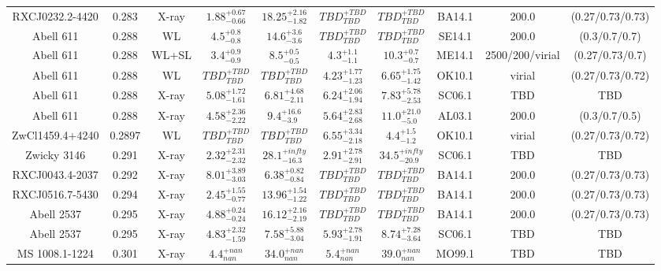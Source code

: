 \begin{table}
\begin{tabular}{cccccccccc}
RXCJ0232.2-4420 & 0.283 & X-ray & ${1.88}^{+0.67}_{-0.66}$ & ${18.25}^{+2.16}_{-1.82}$ & ${TBD}^{+TBD}_{TBD}$ & ${TBD}^{+TBD}_{TBD}$ & BA14.1 & 200.0 & (0.27/0.73/0.73) \\
Abell 611 & 0.288 & WL & ${4.5}^{+0.8}_{-0.8}$ & ${14.6}^{+3.6}_{-3.6}$ & ${TBD}^{+TBD}_{TBD}$ & ${TBD}^{+TBD}_{TBD}$ & SE14.1 & 200.0 & (0.3/0.7/0.7) \\
Abell 611 & 0.288 & WL+SL & ${3.4}^{+0.9}_{-0.9}$ & ${8.5}^{+0.5}_{-0.5}$ & ${4.3}^{+1.1}_{-1.1}$ & ${10.3}^{+0.7}_{-0.7}$ & ME14.1 & 2500/200/virial & (0.27/0.73/0.7) \\
Abell 611 & 0.288 & WL & ${TBD}^{+TBD}_{TBD}$ & ${TBD}^{+TBD}_{TBD}$ & ${4.23}^{+1.77}_{-1.23}$ & ${6.65}^{+1.75}_{-1.42}$ & OK10.1 & virial & (0.27/0.73/0.72) \\
Abell 611 & 0.288 & X-ray & ${5.08}^{+1.72}_{-1.61}$ & ${6.81}^{+4.68}_{-2.11}$ & ${6.24}^{+2.06}_{-1.94}$ & ${7.83}^{+5.78}_{-2.53}$ & SC06.1 & TBD & TBD \\
Abell 611 & 0.288 & X-ray & ${4.58}^{+2.36}_{-2.22}$ & ${9.4}^{+16.6}_{-3.9}$ & ${5.64}^{+2.83}_{-2.68}$ & ${11.0}^{+21.0}_{-5.0}$ & AL03.1 & 200.0 & (0.3/0.7/0.5) \\
ZwCl1459.4+4240 & 0.2897 & WL & ${TBD}^{+TBD}_{TBD}$ & ${TBD}^{+TBD}_{TBD}$ & ${6.55}^{+3.34}_{-2.18}$ & ${4.4}^{+1.5}_{-1.2}$ & OK10.1 & virial & (0.27/0.73/0.72) \\
Zwicky 3146 & 0.291 & X-ray & ${2.32}^{+2.31}_{-2.32}$ & ${28.1}^{+infty}_{-16.3}$ & ${2.91}^{+2.78}_{-2.91}$ & ${34.5}^{+infty}_{-20.9}$ & SC06.1 & TBD & TBD \\
RXCJ0043.4-2037 & 0.292 & X-ray & ${8.01}^{+3.89}_{-3.03}$ & ${6.38}^{+0.82}_{-0.84}$ & ${TBD}^{+TBD}_{TBD}$ & ${TBD}^{+TBD}_{TBD}$ & BA14.1 & 200.0 & (0.27/0.73/0.73) \\
RXCJ0516.7-5430 & 0.294 & X-ray & ${2.45}^{+1.55}_{-0.77}$ & ${13.96}^{+1.54}_{-1.22}$ & ${TBD}^{+TBD}_{TBD}$ & ${TBD}^{+TBD}_{TBD}$ & BA14.1 & 200.0 & (0.27/0.73/0.73) \\
Abell 2537 & 0.295 & X-ray & ${4.88}^{+0.24}_{-0.24}$ & ${16.12}^{+2.16}_{-2.19}$ & ${TBD}^{+TBD}_{TBD}$ & ${TBD}^{+TBD}_{TBD}$ & BA14.1 & 200.0 & (0.27/0.73/0.73) \\
Abell 2537 & 0.295 & X-ray & ${4.83}^{+2.32}_{-1.59}$ & ${7.58}^{+5.88}_{-3.04}$ & ${5.93}^{+2.78}_{-1.91}$ & ${8.74}^{+7.28}_{-3.64}$ & SC06.1 & TBD & TBD \\
MS 1008.1-1224 & 0.301 & X-ray & ${4.4}^{+nan}_{nan}$ & ${34.0}^{+nan}_{nan}$ & ${5.4}^{+nan}_{nan}$ & ${39.0}^{+nan}_{nan}$ & MO99.1 & TBD & TBD \\

\end{tabular}
\end{table}
